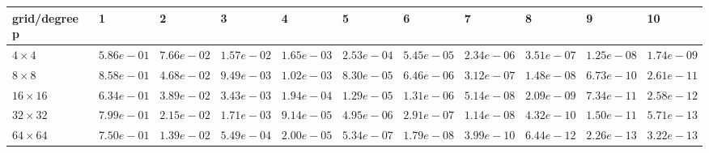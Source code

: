 \begin{tabular}{lllllllllll}
\hline
 grid/degree p   & 1          & 2          & 3          & 4          & 5          & 6          & 7          & 8          & 9          & 10         \\
\hline
 $4 \times 4$    & $5.86e-01$ & $7.66e-02$ & $1.57e-02$ & $1.65e-03$ & $2.53e-04$ & $5.45e-05$ & $2.34e-06$ & $3.51e-07$ & $1.25e-08$ & $1.74e-09$ \\
 $8 \times 8$    & $8.58e-01$ & $4.68e-02$ & $9.49e-03$ & $1.02e-03$ & $8.30e-05$ & $6.46e-06$ & $3.12e-07$ & $1.48e-08$ & $6.73e-10$ & $2.61e-11$ \\
 $16 \times 16$  & $6.34e-01$ & $3.89e-02$ & $3.43e-03$ & $1.94e-04$ & $1.29e-05$ & $1.31e-06$ & $5.14e-08$ & $2.09e-09$ & $7.34e-11$ & $2.58e-12$ \\
 $32 \times 32$  & $7.99e-01$ & $2.15e-02$ & $1.71e-03$ & $9.14e-05$ & $4.95e-06$ & $2.91e-07$ & $1.14e-08$ & $4.32e-10$ & $1.50e-11$ & $5.71e-13$ \\
 $64 \times 64$  & $7.50e-01$ & $1.39e-02$ & $5.49e-04$ & $2.00e-05$ & $5.34e-07$ & $1.79e-08$ & $3.99e-10$ & $6.44e-12$ & $2.26e-13$ & $3.22e-13$ \\
\hline
\end{tabular}